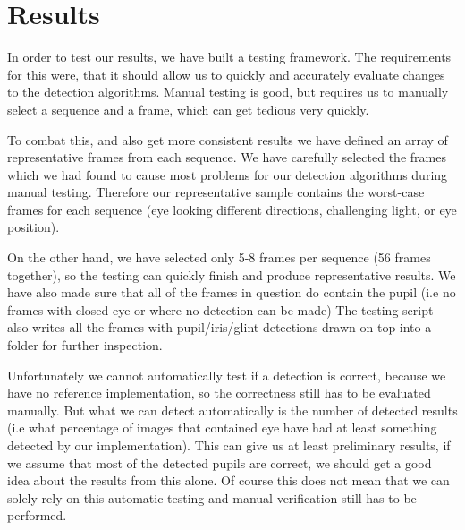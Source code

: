\section{Results}

In order to test our results, we have built a testing framework. The requirements for this were, that it should allow us to quickly and accurately evaluate changes to the detection algorithms. Manual testing is good, but requires us to manually select a sequence and a frame, which can get tedious very quickly.

To combat this, and also get more consistent results we have defined an array of representative frames from each sequence. We have carefully selected the frames which we had found to cause most problems for our detection algorithms during manual testing. Therefore our representative sample contains the worst-case frames for each sequence (eye looking different directions, challenging light, or eye position). 

On the other hand, we have selected only 5-8 frames per sequence (56 frames together), so the testing can quickly finish and produce representative results. We have also made sure that all of the frames in question do contain the pupil (i.e no frames with closed eye or where no detection can be made) The testing script also writes all the frames with pupil/iris/glint detections drawn on top into a folder for further inspection.

Unfortunately we cannot automatically test if a detection is correct, because we have no reference implementation, so the correctness still has to be evaluated manually. But what we can detect automatically is the number of detected results (i.e what percentage of images that contained eye have had at least something detected by our implementation). This can give us  at least preliminary results, if we assume that most of the detected pupils are correct, we should get a good idea about the results from this alone. Of course this does not mean that we can solely rely on this automatic testing and manual verification still has to be performed.

